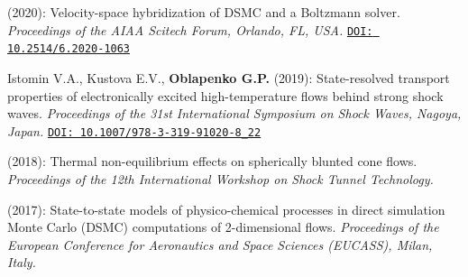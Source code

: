 \begin{enumerate}
   (2020): Velocity-space hybridization of DSMC and a Boltzmann solver. \textit{Proceedings of the AIAA Scitech Forum, Orlando, FL, USA.}
  \newline
    \href{https://doi.org/10.2514/6.2020-1063}{\texttt{DOI: 10.2514/6.2020-1063}}

  \confitemsc Istomin V.A., Kustova E.V., \textbf{Oblapenko G.P.} (2019): State-resolved transport properties of electronically excited high-temperature flows behind strong shock waves. \textit{Proceedings of the 31st International Symposium on Shock Waves, Nagoya, Japan.}
  \newline
    \href{https://doi.org/10.1007/978-3-319-91020-8_22}{\texttt{DOI: 10.1007/978-3-319-91020-8\_22}}

   (2018): Thermal non-equilibrium effects on spherically blunted cone flows. \textit{Proceedings of the 12th International Workshop on Shock Tunnel Technology.}
  
   (2017): State-to-state models of physico-chemical processes in direct simulation Monte Carlo (DSMC) computations of 2-dimensional flows. \textit{Proceedings of the European Conference for Aeronautics and Space Sciences (EUCASS), Milan, Italy.}


\end{enumerate}
